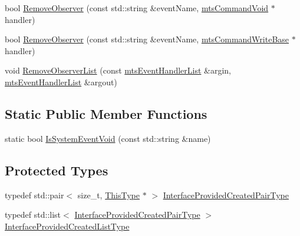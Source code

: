 {\bf }\par
\begin{DoxyCompactItemize}
\item 
bool \hyperlink{classmts_interface_provided_ae280bdf14394c7ba8cf103219bf61d9e}{Remove\+Observer} (const std\+::string \&event\+Name, \hyperlink{classmts_command_void}{mts\+Command\+Void} $\ast$handler)
\item 
bool \hyperlink{classmts_interface_provided_a4f4ebc9636cc26e18a3731ac435d5ad0}{Remove\+Observer} (const std\+::string \&event\+Name, \hyperlink{classmts_command_write_base}{mts\+Command\+Write\+Base} $\ast$handler)
\item 
void \hyperlink{classmts_interface_provided_a945e229f84321482a6c86ec71ed3029f}{Remove\+Observer\+List} (const \hyperlink{classmts_event_handler_list}{mts\+Event\+Handler\+List} \&argin, \hyperlink{classmts_event_handler_list}{mts\+Event\+Handler\+List} \&argout)
\end{DoxyCompactItemize}

\subsection*{Static Public Member Functions}
\begin{DoxyCompactItemize}
\item 
static bool \hyperlink{classmts_interface_provided_a78edc4dea8f5a89e52d36fe01843561b}{Is\+System\+Event\+Void} (const std\+::string \&name)
\end{DoxyCompactItemize}
\subsection*{Protected Types}
\begin{DoxyCompactItemize}
\item 
typedef std\+::pair$<$ size\+\_\+t, \hyperlink{classmts_interface_provided_a487e1de997186e03ed38d365592fd180}{This\+Type} $\ast$ $>$ \hyperlink{classmts_interface_provided_aa164de28d3de94ec992b6b93d5a8de5e}{Interface\+Provided\+Created\+Pair\+Type}
\item 
typedef std\+::list$<$ \hyperlink{classmts_interface_provided_aa164de28d3de94ec992b6b93d5a8de5e}{Interface\+Provided\+Created\+Pair\+Type} $>$ \hyperlink{classmts_interface_provided_ae16c05b551c38856866c199bc4551b98}{Interface\+Provided\+Created\+List\+Type}
\end{DoxyCompactItemize}
